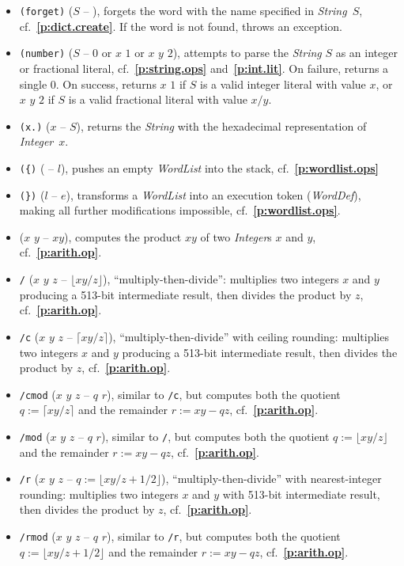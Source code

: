 \documentclass[12pt,oneside]{article}
\def\refpoint#1{{\rm\textbf{\ref{#1}}}}
\let\ptref=\refpoint
\begin{document}
\begin{itemize}
\item {\tt (forget)} ($S$ -- ), forgets the word with the name specified in {\em String}~$S$, cf.~\ptref{p:dict.create}. If the word is not found, throws an exception.
\item {\tt (number)} ($S$ -- $0$ or $x$ $1$ or $x$ $y$ $2$), attempts to parse the {\em String\/} $S$ as an integer or fractional literal, cf.~\ptref{p:string.ops} and~\ptref{p:int.lit}. On failure, returns a single $0$. On success, returns $x$ $1$ if $S$ is a valid integer literal with value $x$, or $x$ $y$ $2$ if $S$ is a valid fractional literal with value $x/y$.
\item {\tt (x.)} ($x$ -- $S$), returns the {\em String\/} with the hexadecimal representation of {\em Integer\/}~$x$.
\item {\tt (\{)} ( -- $l$), pushes an empty {\em WordList\/} into the stack, cf.~\ptref{p:wordlist.ops}
\item {\tt (\})} ($l$ -- $e$), transforms a {\em WordList\/} into an execution token ({\em WordDef\/}), making all further modifications impossible, cf.~\ptref{p:wordlist.ops}.
\item {\tt *} ($x$ $y$ -- $xy$), computes the product $xy$ of two {\em Integer\/}s $x$ and $y$, cf.~\ptref{p:arith.op}.
\item {\tt */} ($x$ $y$ $z$ -- $\lfloor xy/z\rfloor$), ``multiply-then-divide'': multiplies two integers $x$ and $y$ producing a 513-bit intermediate result, then divides the product by $z$, cf.~\ptref{p:arith.op}.
\item {\tt */c} ($x$ $y$ $z$ -- $\lceil xy/z\rceil$), ``multiply-then-divide'' with ceiling rounding: multiplies two integers $x$ and $y$ producing a 513-bit intermediate result, then divides the product by $z$, cf.~\ptref{p:arith.op}.
\item {\tt */cmod} ($x$ $y$ $z$ -- $q$ $r$), similar to {\tt */c}, but computes both the quotient $q:=\lceil xy/z\rceil$ and the remainder $r:=xy-qz$, cf.~\ptref{p:arith.op}.
\item {\tt */mod} ($x$ $y$ $z$ -- $q$ $r$), similar to {\tt */}, but computes both the quotient $q:=\lfloor xy/z\rfloor$ and the remainder $r:=xy-qz$, cf.~\ptref{p:arith.op}.
\item {\tt */r} ($x$ $y$ $z$ -- $q:=\lfloor xy/z+1/2\rfloor$), ``multiply-then-divide'' with nearest-integer rounding: multiplies two integers $x$ and $y$ with 513-bit intermediate result, then divides the product by $z$, cf.~\ptref{p:arith.op}.
\item {\tt */rmod} ($x$ $y$ $z$ -- $q$ $r$), similar to {\tt */r}, but computes both the quotient $q:=\lfloor xy/z+1/2\rfloor$ and the remainder $r:=xy-qz$, cf.~\ptref{p:arith.op}.

\end{itemize}
\end{document}
